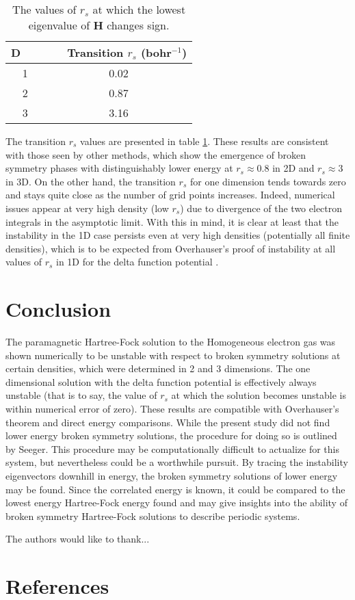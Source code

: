 \documentclass[preprint, journal=prl]{revtex4-1}
\begin{document}
  
  \begin{table}[H]
  \centering
  \caption{The values of $r_s$ at which the lowest eigenvalue of $\mathbf{H}$ changes sign.}
    \begin{tabular}{ c | c }
      D~~~ & ~~ Transition $r_s$ (bohr$^{-1}$) \\
      \hline
      1    &  0.02 \\
      2    &  0.87 \\
      3    &  3.16 \\
      \hline
     \end{tabular}
  \label{table:transition_rs}
  \end{table}  
  The transition $r_s$ values are presented in table \ref{table:transition_rs}. These results are consistent with those seen by other methods, which show the emergence of broken symmetry phases with distinguishably lower energy at $r_s \approx 0.8$ in 2D and $r_s \approx 3$ in 3D\cite{Baguet2014, Bernu2011}. On the other hand, the transition $r_s$ for one dimension tends towards zero and stays quite close as the number of grid points increases. Indeed, numerical issues appear at very high density (low $r_s$) due to divergence of the two electron integrals in the asymptotic limit. With this in mind, it is clear at least that the instability in the 1D case persists even at very high densities (potentially all finite densities), which is to be expected from Overhauser's proof of instability at all values of $r_s$ in 1D for the delta function potential \cite{Overhauser1962}.

  
\section{Conclusion}
  The paramagnetic Hartree-Fock solution to the Homogeneous electron gas was shown numerically to be unstable with respect to broken symmetry solutions at certain densities, which were determined in 2 and 3 dimensions. The one dimensional solution with the delta function potential is effectively always unstable (that is to say, the value of $r_s$ at which the solution becomes unstable is within numerical error of zero). These results are compatible with Overhauser's theorem and direct energy comparisons. While the present study did not find lower energy broken symmetry solutions, the procedure for doing so is outlined by Seeger\cite{Seeger1977}. This procedure may be computationally difficult to actualize for this system, but nevertheless could be a worthwhile pursuit. By tracing the instability eigenvectors downhill in energy, the broken symmetry solutions of lower energy may be found. Since the correlated energy is known, it could be compared to the lowest energy Hartree-Fock energy found and may give insights into the ability of broken symmetry Hartree-Fock solutions to describe periodic systems. 

  
\begin{acknowledgements}
The authors would like to thank...
\end{acknowledgements}

\section{References}

\end{document}
